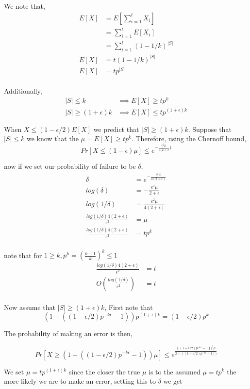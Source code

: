 \documentclass[a4paper]{article}
\def \eps{\epsilon}
\begin{document}
We note that,
\begin{align*}
	E[X] &= E[\sum_{i=1}^{t} X_i] \\
			&= \sum_{i=1}^{t} E[X_i]\\
			&= \sum_{i=1}^{t} (1 - 1/k)^{ |S| }\\
	E[X]	&= t (1 - 1/k)^{ |S| }\\
	E[X]	&= t p^{ |S| }\\
\end{align*}

Additionally,
\begin{align*}
	|S| \leq k &\implies E[X] \geq t p^{ k } \\
	|S| \geq (1+\eps)k &\implies E[X] \leq t p^{ (1+\eps)k } 
\end{align*}


When $X \leq (1-\eps/2)E[X]$ we predict that $|S| \geq (1+\eps)k$. Suppose that $|S| \leq k$ 
we know that the $\mu = E[X] \geq t p^{ k }$. Therefore, using the Chernoff bound,
$$Pr[X \leq (1-\eps)\mu] \leq e^{-\frac{\eps^2\mu}{4(2 + \eps})}$$

now if we set our probability of failure to be $\delta$,
\begin{align*}
	\delta &= e^{-\frac{\eps^2\mu}{4(2 + \eps)}}\\
	log(\delta) &= -\frac{\eps^2\mu}{2 + \eps}\\
	log(1/\delta) &= \frac{\eps^2\mu}{4(2 + \eps)}\\
	\frac{log(1/\delta)4(2 + \eps)}{\eps^2} &= \mu\\
	\frac{log(1/\delta)4(2 + \eps)}{\eps^2} &= tp^k\\
\end{align*}

note that for $1 \geq k, p^k = (\frac{k-1}{k})^k \leq 1$
\begin{align*}
	\frac{log(1/\delta)4(2 + \eps)}{\eps^2} &= t\\
	O(\frac{log(1/\delta)}{\eps^2}) &= t\\
\end{align*}

Now assume that $|S| \geq (1+\eps)k$, 
First note that 
$$ (1 + ((1-\eps/2)p^{-k\eps} - 1))p^{(1+\eps)k} =  (1-\eps/2)p^k $$

The probability of making an error is then,

$$
Pr[X \geq (1 + ((1-\eps/2)p^{-k\eps} - 1))\mu] \leq e^{\frac{((1-\eps/2)p^{-k\eps} - 1))^2 \mu}{2 + ((1-\eps/2)p^{-k\eps} - 1))}}
$$

We set $\mu = tp^{(1+\eps)k}$ since the closer the true $\mu$ is to the assumed $\mu = tp^k$ the more
likely we are to make an error,
setting this to $\delta$ we get 
\end{document}
